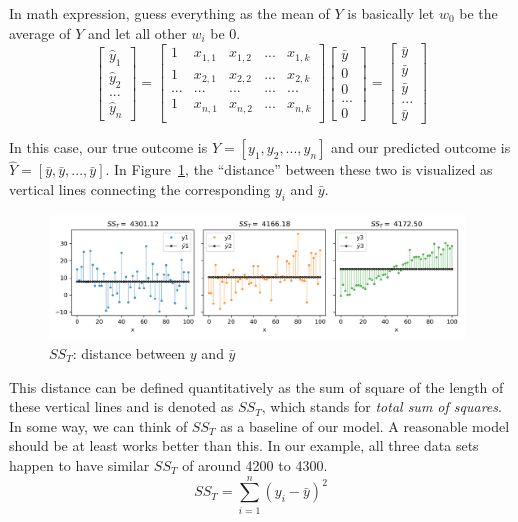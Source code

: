 \documentclass[
	letterpaper
]{article}
\begin{document}
In math expression, guess everything as the mean of $Y$ is basically let $w_0$ be the average of $Y$ and let all other $w_i$ be 0.
\begin{equation}
\begin{bmatrix}\hat y_1 \\ \hat y_2 \\ ... \\ \hat y_n\end{bmatrix}
 = \begin{bmatrix}
1 & x_{1, 1} & x_{1, 2} & ... & x_{1, k} \\
1 & x_{2, 1} & x_{2, 2} & ... & x_{2, k} \\
... & ... & ... & ... & ... \\
1 & x_{n, 1} & x_{n, 2} & ... & x_{n, k} \\
\end{bmatrix}
\begin{bmatrix} \bar y \\ 0 \\  0 \\ ... \\ 0\end{bmatrix}
=
\begin{bmatrix} \bar y \\ \bar y \\ \bar y \\ ... \\ \bar y\end{bmatrix}
\end{equation}

In this case, our true outcome is $Y = [y_1, y_2, ..., y_n]$ and our predicted outcome is $\hat Y = [\bar y, \bar y, ..., \bar y]$.
In Figure~\ref{fig:sst}, the ``distance'' between these two is visualized as vertical lines connecting the corresponding $y_i$ and $\bar y$.
\begin{figure}[htbp]
	\centering
	\includegraphics[width=0.98\textwidth]{figures/comparison-sst.png}
	\caption{$SS_T$: distance between $y$ and $\bar y$}
	\label{fig:sst}
\end{figure}

This distance can be defined quantitatively as the sum of square of the length of these vertical lines and is denoted as $SS_T$, which stands for \textit{total sum of squares}.
In some way, we can think of $SS_T$ as a baseline of our model.
A reasonable model should be at least works better than this.
In our example, all three data sets happen to have similar $SS_T$ of around 4200 to 4300.
\begin{equation}
SS_T = \sum_{i = 1}^n (y_i - \bar y) ^2 
\end{equation}
\end{document}
